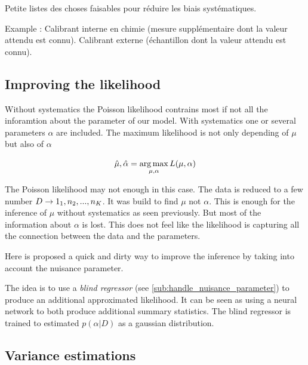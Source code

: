 
Petite listes des choses faisables pour réduire les biais systématiques. 


Example : Calibrant interne en chimie (mesure supplémentaire dont la valeur attendu est connu). Calibrant externe (échantillon dont la valeur attendu est connu).






\subsection{Improving the likelihood} %
\label{sub:improving_the_likelihood}


Without systematics the Poisson likelihood contrains most if not all the inforamtion about the parameter of our model.
With systematics one or several parameters $\alpha$ are included.
The maximum likelihood is not only depending of $\mu$ but also of $\alpha$

\begin{equation}
	\hat \mu, \hat \alpha = \operatorname*{arg\,max}_{\mu, \alpha} L(\mu, \alpha)
\end{equation}

The Poisson likelihood may not enough in this case.
The data is reduced to a few number $D \to 1_1, n_2, ..., n_K$.
It was build to find $\mu$ not $\alpha$.
This is enough for the inference of $\mu$ without systematics as seen previously.
But most of the information about $\alpha$ is lost.
This does not feel like the likelihood is capturing all the connection between the data and the parameters.

Here is proposed a quick and dirty way to improve the inference by taking into account the nuisance parameter.

The idea is to use a \emph{blind regressor} (see \autoref{sub:handle_nuisance_parameter}) to produce an additional approximated likelihood.
It can be seen as using a neural network to both produce additional summary statistics.
The blind regressor is trained to estimated $p(\alpha | D)$ as a gaussian distribution.







\subsection{Variance estimations} %
\label{sub:variance_estimations}

